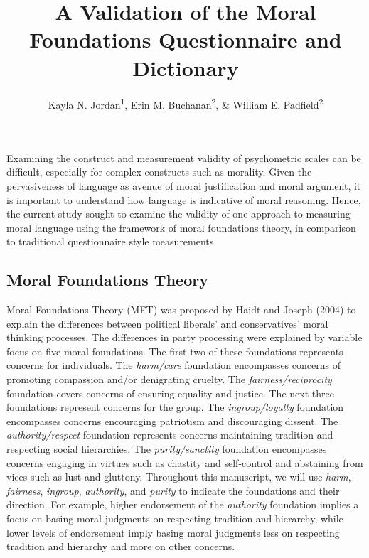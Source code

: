 \documentclass[english,man]{apa6}
\title{A Validation of the Moral Foundations Questionnaire and Dictionary}
\author{Kayla N. Jordan\textsuperscript{1}, Erin M. Buchanan\textsuperscript{2}, \& William E. Padfield\textsuperscript{2}}
\affiliation{
    \vspace{0.5cm}
          \textsuperscript{1} University of Texas - Austin\\
          \textsuperscript{2} Missouri State University  }
\theoremstyle{definition}
\theoremstyle{definition}
\theoremstyle{definition}
\theoremstyle{remark}
\begin{document}
\maketitle

\setcounter{secnumdepth}{0}



Examining the construct and measurement validity of psychometric scales
can be difficult, especially for complex constructs such as morality.
Given the pervasiveness of language as avenue of moral justification and
moral argument, it is important to understand how language is indicative
of moral reasoning. Hence, the current study sought to examine the
validity of one approach to measuring moral language using the framework
of moral foundations theory, in comparison to traditional questionnaire
style measurements.

\subsection{Moral Foundations Theory}\label{moral-foundations-theory}

Moral Foundations Theory (MFT) was proposed by Haidt and Joseph (2004)
to explain the differences between political liberals' and
conservatives' moral thinking processes. The differences in party
processing were explained by variable focus on five moral foundations.
The first two of these foundations represents concerns for individuals.
The \emph{harm/care} foundation encompasses concerns of promoting
compassion and/or denigrating cruelty. The \emph{fairness/reciprocity}
foundation covers concerns of ensuring equality and justice. The next
three foundations represent concerns for the group. The
\emph{ingroup/loyalty} foundation encompasses concerns encouraging
patriotism and discouraging dissent. The \emph{authority/respect}
foundation represents concerns maintaining tradition and respecting
social hierarchies. The \emph{purity/sanctity} foundation encompasses
concerns engaging in virtues such as chastity and self-control and
abstaining from vices such as lust and gluttony. Throughout this
manuscript, we will use \emph{harm}, \emph{fairness}, \emph{ingroup},
\emph{authority}, and \emph{purity} to indicate the foundations and
their direction. For example, higher endorsement of the \emph{authority}
foundation implies a focus on basing moral judgments on respecting
tradition and hierarchy, while lower levels of endorsement imply basing
moral judgments less on respecting tradition and hierarchy and more on
other concerns.
\end{document}
